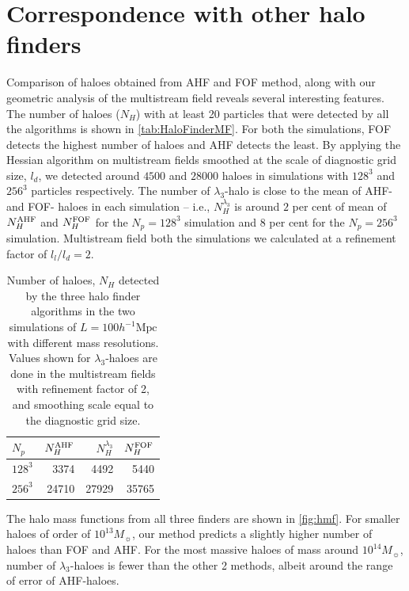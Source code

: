 \documentclass[fleqn,usenatbib,useAMS]{mnras}
\begin{document}
\section{Correspondence with other halo finders}
\label{sub:compareHalo}




Comparison of haloes obtained from AHF and FOF method, along with our geometric analysis of the multistream field reveals several interesting features. The number of haloes ($N_H$) with at least 20 particles that were detected by all the algorithms is shown in \autoref{tab:HaloFinderMF}. For both the simulations, FOF detects the highest number of haloes and AHF detects the least. By applying the Hessian algorithm on multistream fields smoothed at the scale of diagnostic grid size, $l_d$, we detected around $4500$ and $28000$ haloes in simulations with $128^3$ and $256^3$ particles respectively. The number of $\lambda_3$-halo is close to the mean of AHF- and FOF- haloes in each simulation -- i.e., $N_H^{\lambda_3}$ is around $2$ per cent of mean of $N_H^{\rm AHF}$ and $N_H^{\rm FOF}$ for the $N_p = 128^3$ simulation and $8$ per cent for the $N_p = 256^3$ simulation. Multistream field both the simulations we calculated at a refinement factor of $l_l/l_d = 2$. 

\begin{table}
  \caption{Number of haloes, $N_H$ detected by the three halo finder algorithms in the two simulations of $L = 100 h^{-1} \text{Mpc}$ with different mass resolutions. Values shown for $\lambda_3$-haloes are done in the multistream fields with refinement factor of 2, and smoothing scale equal to the diagnostic grid size.}
\begin{tabular}{|l|r|r|r|}
\hline
$N_p$  &  $N_H^{\rm AHF}$ & $N_H^{\lambda_3}$ &  $N_H^{\rm FOF}$  \\ \hline
$128^3$   & 3374  & 4492 &  5440  \\ \hline
$256^3$   & 24710  & 27929 & 35765  \\ \hline

\end{tabular}
\label{tab:HaloFinderMF}
\end{table}



The halo mass functions from all three finders are shown in \autoref{fig:hmf}. For smaller haloes of order of $10^{13} M_{\sun}$, our method predicts a slightly higher number of haloes than FOF and AHF. For the most massive haloes of mass around $10^{14} M_{\sun}$, number of $\lambda_3$-haloes is fewer than the other 2 methods, albeit around the range of error of AHF-haloes.  
\end{document}
